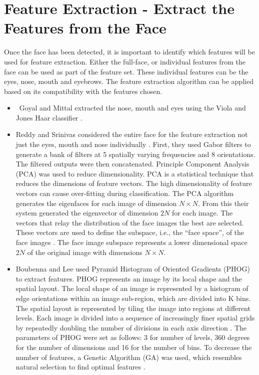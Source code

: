 \section{Feature Extraction - Extract the Features from the Face }
Once the face has been detected, it is important to identify which features will be used for feature extraction. Either the full-face, or individual features from the face can be used as part of the feature set. These individual features can be the eyes, nose, mouth and eyebrows. The feature extraction algorithm can be applied based on its compatibility with the features chosen. 
\begin{itemize}
\item\ Goyal and Mittal extracted the nose, mouth and eyes using the Viola and Jones Haar classifier \cite{1}.

\item Reddy and Srinivas considered the entire face for the feature extraction not just the eyes, mouth and nose individually . First, they used Gabor filters to generate a bank of filters at 5 spatially varying frequencies and 8 orientations. The filtered outputs were then concatenated. Principle Component Analysis (PCA) was used to reduce dimensionality. PCA is a statistical technique that reduces the dimensions of feature vectors. The high dimensionality of feature vectors can cause over-fitting during classification. The PCA algorithm generates the eigenfaces for each image of dimension $N\times N$. From this their system generated the eigenvector of dimension $2N$ for each image. The vectors that relay the distribution of the face images the best are selected. These vectors are used to define the subspace, i.e., the ``face space'', of the face images \cite{2}. The face image subspace represents a lower dimensional space $2N$ of the original image with dimensions $N\times N$.

\item Boubenna and Lee used Pyramid Histogram of Oriented Gradients (PHOG) to extract features. PHOG represents an image by its local shape and the spatial layout. The local shape of an image is represented by a histogram of edge orientations within an image sub-region, which are divided into K bins. The spatial layout is represented by tiling the image into regions at different levels. Each image is divided into a sequence of increasingly finer spatial grids by repeatedly doubling the number of divisions in each axis direction \cite{phog}. The parameters of PHOG were set as follows: 3 for number of levels, 360 degrees for the number of dimensions and 16 for the number of bins. To decrease the number of features, a Genetic Algorithm (GA) was used, which resembles natural selection to find optimal features \cite{3}.
\end{itemize}


